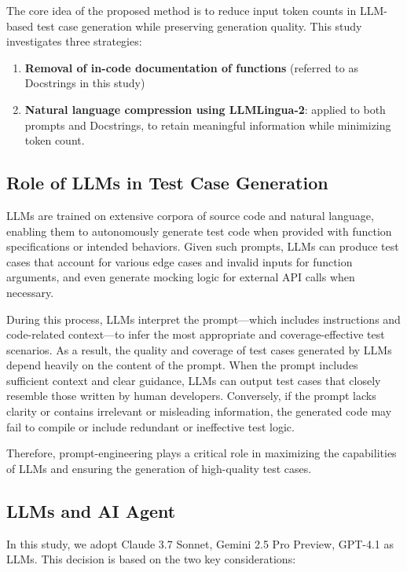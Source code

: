 The core idea of the proposed method is to reduce input token counts in LLM-based test case generation while preserving generation quality. This study investigates three strategies:

\begin{enumerate}
    \item \textbf{Removal of in-code documentation of functions} (referred to as Docstrings in this study)
\vspace{0.2cm}
    \item \textbf{Natural language compression using LLMLingua-2}: applied to both prompts and Docstrings, to retain meaningful information while minimizing token count.
\end{enumerate}

\subsection{Role of LLMs in Test Case Generation}
LLMs are trained on extensive corpora of source code and natural language, enabling them to autonomously generate test code when provided with function specifications or intended behaviors. Given such prompts, LLMs can produce test cases that account for various edge cases and invalid inputs for function arguments, and even generate mocking logic for external API calls when necessary.

During this process, LLMs interpret the prompt—which includes instructions and code-related context—to infer the most appropriate and coverage-effective test scenarios. As a result, the quality and coverage of test cases generated by LLMs depend heavily on the content of the prompt. When the prompt includes sufficient context and clear guidance, LLMs can output test cases that closely resemble those written by human developers. Conversely, if the prompt lacks clarity or contains irrelevant or misleading information, the generated code may fail to compile or include redundant or ineffective test logic.

Therefore, prompt-engineering plays a critical role in maximizing the capabilities of LLMs and ensuring the generation of high-quality test cases.

\subsection{LLMs and AI Agent}
In this study, we adopt Claude 3.7 Sonnet, Gemini 2.5 Pro Preview, GPT-4.1 as LLMs. This decision is based on the two key considerations:


